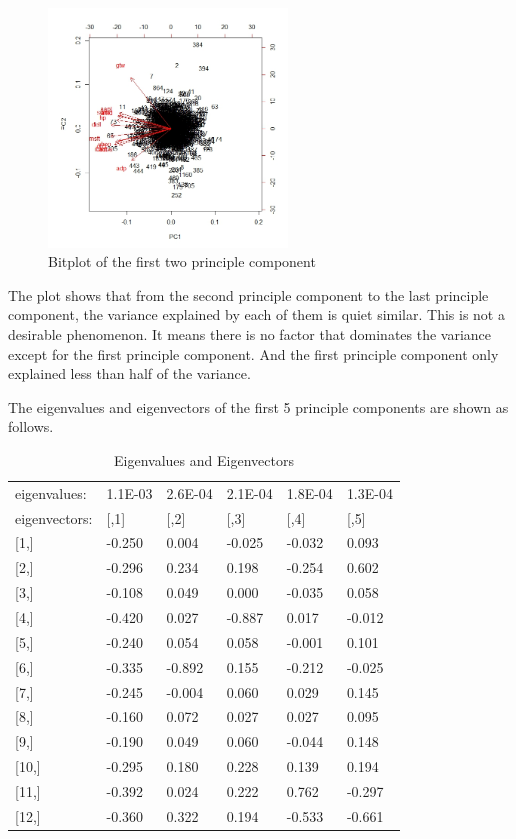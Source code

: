 \documentclass[conference]{IEEEtran}
\begin{document}
\begin{figure}[!h]
\centering
\includegraphics[width=2.5in]{fig2.jpeg}
\caption{Bitplot of the first two principle component}
\label{fig2}
\end{figure}

The plot shows that from the second principle component to the last principle component, the variance explained by each of them is quiet similar. This is not a desirable phenomenon. It means there is no factor that dominates the variance except for the first principle component. And the first principle component only explained less than half of the variance. 

The eigenvalues and eigenvectors of the first 5 principle components are shown as follows. 

\begin{table}[!h]
\centering
\caption{Eigenvalues and Eigenvectors}
\label{eigen}
\begin{tabular}{llllll}
eigenvalues:  & 1.1E-03  & 2.6E-04  & 2.1E-04  & 1.8E-04  & 1.3E-04  \\
eigenvectors: & {[},1{]} & {[},2{]} & {[},3{]} & {[},4{]} & {[},5{]} \\
{[}1,{]}      & -0.250   & 0.004    & -0.025   & -0.032   & 0.093    \\
{[}2,{]}      & -0.296   & 0.234    & 0.198    & -0.254   & 0.602    \\
{[}3,{]}      & -0.108   & 0.049    & 0.000    & -0.035   & 0.058    \\
{[}4,{]}      & -0.420   & 0.027    & -0.887   & 0.017    & -0.012   \\
{[}5,{]}      & -0.240   & 0.054    & 0.058    & -0.001   & 0.101    \\
{[}6,{]}      & -0.335   & -0.892   & 0.155    & -0.212   & -0.025   \\
{[}7,{]}      & -0.245   & -0.004   & 0.060    & 0.029    & 0.145    \\
{[}8,{]}      & -0.160   & 0.072    & 0.027    & 0.027    & 0.095    \\
{[}9,{]}      & -0.190   & 0.049    & 0.060    & -0.044   & 0.148    \\
{[}10,{]}     & -0.295   & 0.180    & 0.228    & 0.139    & 0.194    \\
{[}11,{]}     & -0.392   & 0.024    & 0.222    & 0.762    & -0.297   \\
{[}12,{]}     & -0.360   & 0.322    & 0.194    & -0.533   & -0.661  
\end{tabular}
\end{table}
\end{document}
